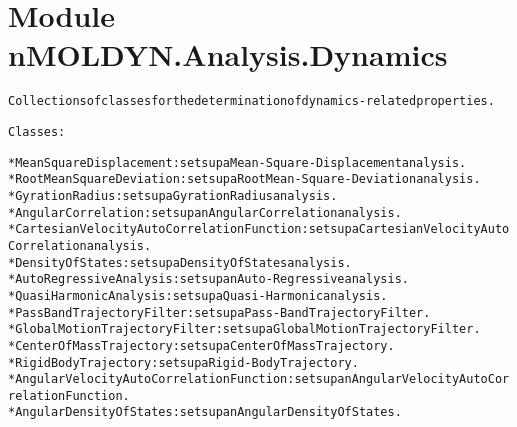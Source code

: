 %
%
%


\section{Module nMOLDYN.Analysis.Dynamics}

    \label{nMOLDYN:Analysis:Dynamics}
\begin{alltt}
Collections of classes for the determination of dynamics-related properties.

Classes:

    * MeanSquareDisplacement                   : sets up a Mean-Square-Displacement analysis.
    * RootMeanSquareDeviation                  : sets up a Root Mean-Square-Deviation analysis.
    * GyrationRadius                           : sets up a Gyration Radius analysis.
    * AngularCorrelation                       : sets up an Angular Correlation analysis.
    * CartesianVelocityAutoCorrelationFunction : sets up a Cartesian Velocity AutoCorrelation analysis. 
    * DensityOfStates                          : sets up a Density Of States analysis.
    * AutoRegressiveAnalysis                   : sets up an Auto-Regressive analysis.
    * QuasiHarmonicAnalysis                    : sets up a Quasi-Harmonic analysis.
    * PassBandTrajectoryFilter                 : sets up a Pass-Band Trajectory Filter.
    * GlobalMotionTrajectoryFilter             : sets up a Global Motion Trajectory Filter.
    * CenterOfMassTrajectory                   : sets up a Center Of Mass Trajectory.
    * RigidBodyTrajectory                      : sets up a Rigid-Body Trajectory.
    * AngularVelocityAutoCorrelationFunction   : sets up an Angular Velocity AutoCorrelation Function.
    * AngularDensityOfStates                   : sets up an Angular Density Of States.
\end{alltt}



